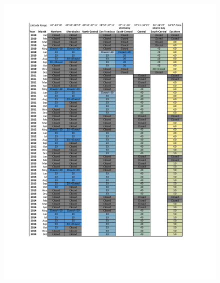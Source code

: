 \documentclass[12pt,]{article}
\begin{document}
\begin{figure}
\centering
\includegraphics{Figures/Rec_regs3.pdf}
\caption{\label{fig:Rec_regs3}}
\end{figure}

\FloatBarrier
\end{document}

